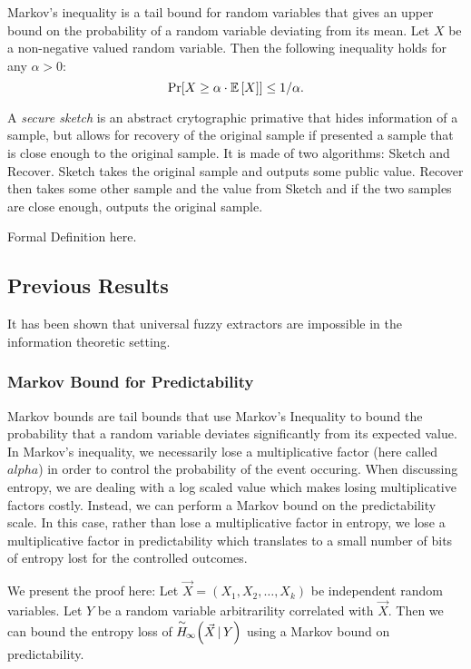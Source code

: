 \begin{definition}
    Markov's inequality is a tail bound for random variables that gives an upper bound on the probability of a random variable deviating from its mean. Let $X$ be a non-negative valued random variable. Then the following inequality holds for any $\alpha > 0$: 
    \[ 
      \Pr\!\left[X \geq \alpha \cdot \operatorname*{\mathbb{E}}\left[X\right]\right] \leq 1/\alpha .
    \]
\end{definition}

\begin{definition}
    A \emph{secure sketch} is an abstract crytographic primative that hides information of a sample, but allows for recovery of the original sample if presented a sample that is close enough to the original sample. It is made of two algorithms: Sketch and Recover. Sketch takes the original sample and outputs some public value. Recover then takes some other sample and the value from Sketch and if the two samples are close enough, outputs the original sample. 

    Formal Definition here. 
\end{definition}

\subsection{Previous Results}
It has been shown that universal fuzzy extractors are impossible in the information theoretic setting. 

\subsubsection{Markov Bound for Predictability}
Markov bounds are tail bounds that use Markov's Inequality to bound the probability that a random variable deviates significantly from its expected value. In Markov's inequality, we necessarily lose a multiplicative factor (here called $alpha$) in order to control the probability of the event occuring. When discussing entropy, we are dealing with a log scaled value which makes losing multiplicative factors costly. Instead, we can perform a Markov bound on the predictability scale. In this case, rather than lose a multiplicative factor in entropy, we lose a multiplicative factor in predictability which translates to a small number of bits of entropy lost for the controlled outcomes.

We present the proof here:
Let $\vec{X} = (X_1, X_2, \ldots, X_k)$ be independent random variables. Let $Y$ be a random variable arbitrarility correlated with $\vec{X}$. Then we can bound the entropy loss of $\overset{\sim}{H}\!_{\infty}\!\left(\vec{X}\,|\,Y\right)$ using a Markov bound on predictability. 

